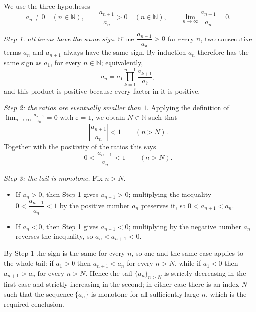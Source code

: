 \documentclass[11pt,a4paper]{article}
\newenvironment{solution}[1]{%
  \par\addvspace{1.7ex}%
  \noindent{\color{solutioncolor}\textbf{#1}}\hspace{0.55em}\ignorespaces}%
  {\par\addvspace{0.9ex}}
\begin{document}
\begin{solution}{Solution 2.1.6}\label{xs:2.1.6}
We use the three hypotheses
\[
a_n\ne 0\quad(n\in\mathbb N),\qquad \frac{a_{n+1}}{a_n}>0\quad(n\in\mathbb N),
\qquad \lim_{n\to\infty}\frac{a_{n+1}}{a_n}=0 .
\]

\emph{Step 1: all terms have the same sign.} Since $\dfrac{a_{n+1}}{a_n}>0$ for
every $n$, two consecutive terms $a_n$ and $a_{n+1}$ always have the same sign.
By induction $a_n$ therefore has the same sign as $a_1$, for every
$n\in\mathbb N$; equivalently,
\[
a_n=a_1\prod_{k=1}^{n-1}\frac{a_{k+1}}{a_k},
\]
and this product is positive because every factor in it is positive.

\emph{Step 2: the ratios are eventually smaller than $1$.} Applying the
definition of $\displaystyle\lim_{n\to\infty}\frac{a_{n+1}}{a_n}=0$ with
$\varepsilon=1$, we obtain $N\in\mathbb N$ such that
\[
\left|\frac{a_{n+1}}{a_n}\right|<1\qquad(n>N).
\]
Together with the positivity of the ratios this says
\[
0<\frac{a_{n+1}}{a_n}<1\qquad(n>N).
\]

\emph{Step 3: the tail is monotone.} Fix $n>N$.
\begin{itemize}
  \item If $a_n>0$, then Step 1 gives $a_{n+1}>0$; multiplying the inequality
        $0<\dfrac{a_{n+1}}{a_n}<1$ by the positive number $a_n$ preserves it, so
        $0<a_{n+1}<a_n$.
  \item If $a_n<0$, then Step 1 gives $a_{n+1}<0$; multiplying by the negative
        number $a_n$ reverses the inequality, so $a_n<a_{n+1}<0$.
\end{itemize}
By Step 1 the sign is the same for every $n$, so one and the same case applies to
the whole tail: if $a_1>0$ then $a_{n+1}<a_n$ for every $n>N$, while if $a_1<0$
then $a_{n+1}>a_n$ for every $n>N$. Hence the tail $\{a_n\}_{n>N}$ is strictly
decreasing in the first case and strictly increasing in the second; in either
case there is an index $N$ such that the sequence $\{a_n\}$ is monotone for all
sufficiently large $n$, which is the required conclusion.
\end{solution}
\end{document}
